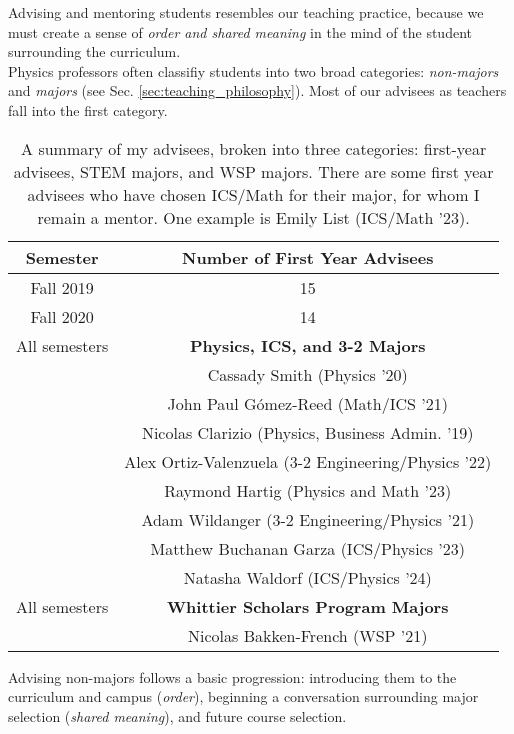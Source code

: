 \documentclass[../../../main.tex]{subfiles}
\begin{document}
Advising and mentoring students resembles our teaching practice, because we must create a sense of \textit{order and shared meaning} in the mind of the student surrounding the curriculum. 
\\
\vspace{0.25cm}
Physics professors often classifiy students into two broad categories: \textit{non-majors} and \textit{majors} (see Sec. \ref{sec:teaching_philosophy}).  Most of our advisees as teachers fall into the first category.
\\
\vspace{0.25cm}
\begin{table}
\centering
\begin{tabular}{| c | c |}
\hline
\hline
Semester & \textbf{Number of First Year Advisees} \\ \hline
Fall 2019 & 15 \\ \hline
Fall 2020 & 14 \\ \hline
\hline
All semesters & \textbf{Physics, ICS, and 3-2 Majors} \\ \hline 
& Cassady Smith (Physics '20) \\ \hline
& John Paul G\'{o}mez-Reed (Math/ICS '21) \\ \hline
& Nicolas Clarizio (Physics, Business Admin. '19) \\ \hline
& Alex Ortiz-Valenzuela (3-2 Engineering/Physics  '22) \\ \hline
& Raymond Hartig (Physics and Math '23) \\ \hline
& Adam Wildanger (3-2 Engineering/Physics '21) \\ \hline
& Matthew Buchanan Garza (ICS/Physics '23) \\ \hline
& Natasha Waldorf (ICS/Physics '24) \\ \hline \hline
All semesters & \textbf{Whittier Scholars Program Majors} \\ \hline
& Nicolas Bakken-French (WSP '21) \\ \hline
\end{tabular}
\caption{\label{tab:advisees} A summary of my advisees, broken into three categories: first-year advisees, STEM majors, and WSP majors.  There are some first year advisees who have chosen ICS/Math for their major, for whom I remain a mentor.  One example is Emily List (ICS/Math '23).}
\end{table}

Advising non-majors follows a basic progression: introducing them to the curriculum and campus (\textit{order}), beginning a conversation surrounding major selection (\textit{shared meaning}), and future course selection.
\end{document}
